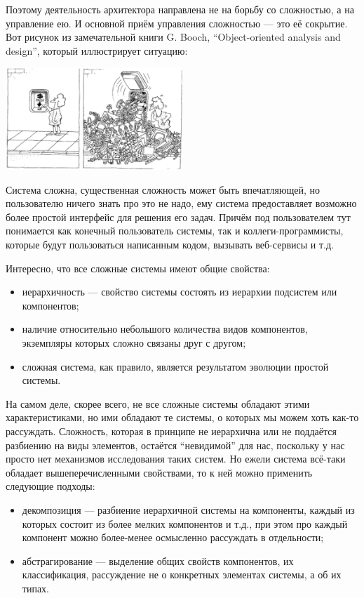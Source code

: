 \documentclass[a5paper]{article}
\begin{document}
Поэтому деятельность архитектора направлена не на борьбу со сложностью, а на управление ею. И основной приём управления сложностью --- это её сокрытие. Вот рисунок из замечательной книги G. Booch, ``Object-oriented analysis and design'', который иллюстрирует ситуацию:

\begin{center}
	\includegraphics[width=0.5\textwidth]{complexityHiding.png}
\end{center}

Система сложна, существенная сложность может быть впечатляющей, но пользователю ничего знать про это не надо, ему система предоставляет возможно более простой интерфейс для решения его задач. Причём под пользователем тут понимается как конечный пользователь системы, так и коллеги-программисты, которые будут пользоваться написанным кодом, вызывать веб-сервисы и т.д.

Интересно, что все сложные системы имеют общие свойства:

\begin{itemize}
	\item иерархичность --- свойство системы состоять из иерархии подсистем или компонентов;
	\item наличие относительно небольшого количества видов компонентов, экземпляры которых сложно связаны друг с другом;
	\item сложная система, как правило, является результатом эволюции простой системы.
\end{itemize}

На самом деле, скорее всего, не все сложные системы обладают этими характеристиками, но ими обладают те системы, о которых мы можем хоть как-то рассуждать. Сложность, которая в принципе не иерархична или не поддаётся разбиению на виды элементов, остаётся ``невидимой'' для нас, поскольку у нас просто нет механизмов исследования таких систем. Но ежели система всё-таки обладает вышеперечисленными свойствами, то к ней можно применить следующие подходы:

\begin{itemize}
	\item декомпозиция --- разбиение иерархичной системы на компоненты, каждый из которых состоит из более мелких компонентов и т.д., при этом про каждый компонент можно более-менее осмысленно рассуждать в отдельности;
	\item абстрагирование --- выделение общих свойств компонентов, их классификация, рассуждение не о конкретных элементах системы, а об их типах.
\end{itemize}
\end{document}
